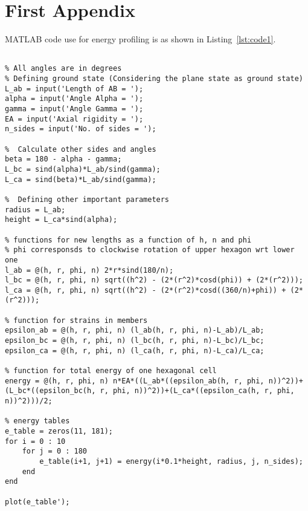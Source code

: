 \appendix
\chapter{First Appendix}

MATLAB code use for energy profiling is as shown in Listing~\ref{lst:code1}.

\begin{lstlisting}[caption=Source code for {\it EnrgyProfile.m},label=lst:code1,breaklines=true,basewidth=4pt,prebreak=**,postbreak=**,frame=single]

% All angles are in degrees
% Defining ground state (Considering the plane state as ground state)
L_ab = input('Length of AB = ');
alpha = input('Angle Alpha = ');
gamma = input('Angle Gamma = ');
EA = input('Axial rigidity = ');
n_sides = input('No. of sides = ');

%  Calculate other sides and angles
beta = 180 - alpha - gamma;
L_bc = sind(alpha)*L_ab/sind(gamma);
L_ca = sind(beta)*L_ab/sind(gamma);

%  Defining other important parameters
radius = L_ab;
height = L_ca*sind(alpha);

% functions for new lengths as a function of h, n and phi
% phi corresponsds to clockwise rotation of upper hexagon wrt lower one
l_ab = @(h, r, phi, n) 2*r*sind(180/n);
l_bc = @(h, r, phi, n) sqrt((h^2) - (2*(r^2)*cosd(phi)) + (2*(r^2)));
l_ca = @(h, r, phi, n) sqrt((h^2) - (2*(r^2)*cosd((360/n)+phi)) + (2*(r^2)));

% function for strains in members
epsilon_ab = @(h, r, phi, n) (l_ab(h, r, phi, n)-L_ab)/L_ab;
epsilon_bc = @(h, r, phi, n) (l_bc(h, r, phi, n)-L_bc)/L_bc;
epsilon_ca = @(h, r, phi, n) (l_ca(h, r, phi, n)-L_ca)/L_ca;

% function for total energy of one hexagonal cell
energy = @(h, r, phi, n) n*EA*((L_ab*((epsilon_ab(h, r, phi, n))^2))+(L_bc*((epsilon_bc(h, r, phi, n))^2))+(L_ca*((epsilon_ca(h, r, phi, n))^2)))/2;

% energy tables
e_table = zeros(11, 181);
for i = 0 : 10
    for j = 0 : 180
        e_table(i+1, j+1) = energy(i*0.1*height, radius, j, n_sides);
    end
end

plot(e_table');
\end{lstlisting}